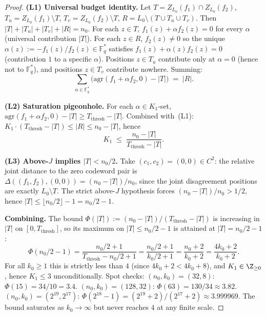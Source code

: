 \documentclass[11pt]{article}
\theoremstyle{definition}
\theoremstyle{remark}
\newcommand{\FF}{\mathbb{F}}
\begin{document}
\begin{proof}
\textbf{(L1) Universal budget identity.}
Let $T = Z_{L_0}(f_1) \cap Z_{L_0}(f_2)$, $T_u = Z_{L_0}(f_1) \setminus T$,
$T_v = Z_{L_0}(f_2) \setminus T$, $R = L_0 \setminus (T \cup T_u \cup T_v)$.
Then $|T| + |T_u| + |T_v| + |R| = n_0$. For each $z \in T$,
$f_1(z) + \alpha f_2(z) = 0$ for every $\alpha$ (universal contribution
$|T|$). For each $z \in R$, $f_2(z) \neq 0$ so the unique $\alpha(z) :=
-f_1(z)/f_2(z) \in \FF_q^*$ satisfies $f_1(z) + \alpha(z) f_2(z) = 0$
(contribution $1$ to a specific $\alpha$). Positions $z \in T_u$
contribute only at $\alpha = 0$ (hence not to $\FF_q^*$), and positions
$z \in T_v$ contribute nowhere. Summing:
\[
\sum_{\alpha \in \FF_q^*} \bigl(\mathrm{agr}(f_1 + \alpha f_2, 0) - |T|\bigr)
\;=\; |R|.
\]

\textbf{(L2) Saturation pigeonhole.}
For each $\alpha \in K_1$-set,
$\mathrm{agr}(f_1 + \alpha f_2, 0) - |T| \geq T_{\mathrm{thresh}} - |T|$.
Combined with~(L1):
$K_1 \cdot (T_{\mathrm{thresh}} - |T|) \leq |R| \leq n_0 - |T|$, hence
\[
 K_1 \;\leq\; \frac{n_0 - |T|}{T_{\mathrm{thresh}} - |T|}.
\]

\textbf{(L3) Above-$J$ implies $|T| < n_0/2$.}
Take $(c_1, c_2) = (0, 0) \in C^2$: the relative joint distance to the
zero codeword pair is $\Delta((f_1, f_2), (0, 0)) = (n_0 - |T|)/n_0$,
since the joint disagreement positions are exactly $L_0 \setminus T$.
The strict above-$J$ hypothesis forces $(n_0 - |T|)/n_0 > 1/2$, hence
$|T| \leq \lfloor n_0/2 \rfloor - 1 = n_0/2 - 1$.

\textbf{Combining.} The bound
$\Phi(|T|) := (n_0 - |T|)/(T_{\mathrm{thresh}} - |T|)$ is increasing in
$|T|$ on $[0, T_{\mathrm{thresh}}]$, so its maximum on $|T| \leq
n_0/2 - 1$ is attained at $|T| = n_0/2 - 1$:
\[
 \Phi(n_0/2 - 1) = \frac{n_0/2 + 1}{T_{\mathrm{thresh}} - n_0/2 + 1}
 = \frac{n_0/2 + 1}{k_0/2 + 1} = \frac{n_0 + 2}{k_0 + 2}
 = \frac{4 k_0 + 2}{k_0 + 2}.
\]
For all $k_0 \geq 1$ this is strictly less than $4$ (since
$4 k_0 + 2 < 4 k_0 + 8$), and $K_1 \in \Z_{\geq 0}$, hence $K_1 \leq 3$
unconditionally. Spot checks:
$(n_0, k_0) = (32, 8)$: $\Phi(15) = 34/10 = 3.4$.
$(n_0, k_0) = (128, 32)$: $\Phi(63) = 130/34 \approx 3.82$.
$(n_0, k_0) = (2^{19}, 2^{17})$: $\Phi(2^{18} - 1) = (2^{19} + 2)/(2^{17} + 2)
\approx 3.999969$. The bound saturates as $k_0 \to \infty$ but never
reaches $4$ at any finite scale.
\end{proof}
\end{document}

